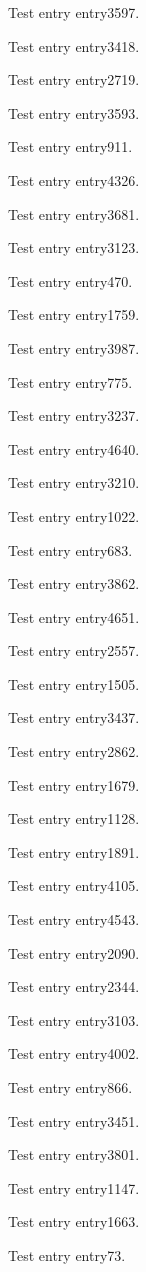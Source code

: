 Test entry \gls{entry3597}.

Test entry \gls{entry3418}.

Test entry \gls{entry2719}.

Test entry \gls{entry3593}.

Test entry \gls{entry911}.

Test entry \gls{entry4326}.

Test entry \gls{entry3681}.

Test entry \gls{entry3123}.

Test entry \gls{entry470}.

Test entry \gls{entry1759}.

Test entry \gls{entry3987}.

Test entry \gls{entry775}.

Test entry \gls{entry3237}.

Test entry \gls{entry4640}.

Test entry \gls{entry3210}.

Test entry \gls{entry1022}.

Test entry \gls{entry683}.

Test entry \gls{entry3862}.

Test entry \gls{entry4651}.

Test entry \gls{entry2557}.

Test entry \gls{entry1505}.

Test entry \gls{entry3437}.

Test entry \gls{entry2862}.

Test entry \gls{entry1679}.

Test entry \gls{entry1128}.

Test entry \gls{entry1891}.

Test entry \gls{entry4105}.

Test entry \gls{entry4543}.

Test entry \gls{entry2090}.

Test entry \gls{entry2344}.

Test entry \gls{entry3103}.

Test entry \gls{entry4002}.

Test entry \gls{entry866}.

Test entry \gls{entry3451}.

Test entry \gls{entry3801}.

Test entry \gls{entry1147}.

Test entry \gls{entry1663}.

Test entry \gls{entry73}.


